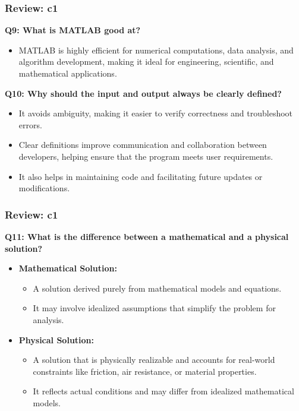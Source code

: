 \documentclass[
	11pt, %
]{beamer}
\begin{document}

\begin{frame}
	\frametitle{Review: c1}

\textbf{Q9: What is MATLAB good at?}

	\begin{itemize}
	    \item MATLAB is highly efficient for numerical computations, data analysis, and algorithm development, making it ideal for engineering, scientific, and mathematical applications.
	\end{itemize}

	\vspace{0.5cm}

	\textbf{Q10: Why should the input and output always be clearly defined?}

	\begin{itemize}
	    \item It avoids ambiguity, making it easier to verify correctness and troubleshoot errors.
	    \item Clear definitions improve communication and collaboration between developers, helping ensure that the program meets user requirements.
	    \item It also helps in maintaining code and facilitating future updates or modifications.
	\end{itemize}
	

\end{frame}




\begin{frame}
	\frametitle{Review: c1}

	\textbf{Q11: What is the difference between a mathematical and a physical solution?}

	\begin{itemize}
	    \item \textbf{Mathematical Solution:}
	    \begin{itemize}
	        \item A solution derived purely from mathematical models and equations. 
            \item It may involve idealized assumptions that simplify the problem for analysis.
	    \end{itemize}
	    
	    \item \textbf{Physical Solution:}
	    \begin{itemize}
	        \item A solution that is physically realizable and accounts for real-world constraints like friction, air resistance, or material properties.
            \item It reflects actual conditions and may differ from idealized mathematical models.
	    \end{itemize}
	\end{itemize}

\end{frame}
\end{document}

